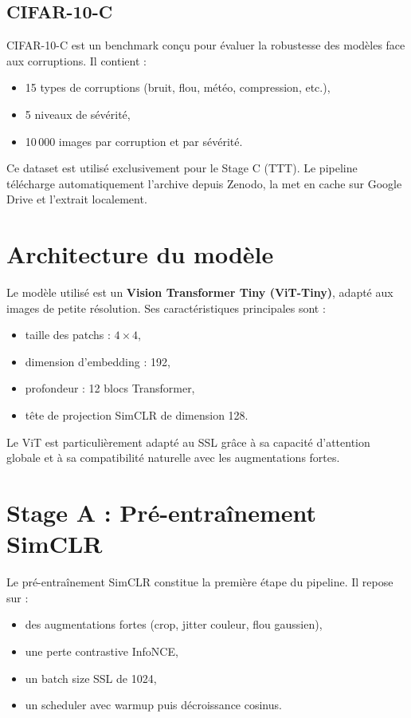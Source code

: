 \documentclass[12pt,a4paper]{report}
\begin{document}
	\subsection*{CIFAR-10-C}
	CIFAR-10-C est un benchmark conçu pour évaluer la robustesse des modèles face aux corruptions. Il contient :
	\begin{itemize}
		\item 15 types de corruptions (bruit, flou, météo, compression, etc.),
		\item 5 niveaux de sévérité,
		\item 10\,000 images par corruption et par sévérité.
	\end{itemize}
	
	Ce dataset est utilisé exclusivement pour le Stage C (TTT). Le pipeline télécharge automatiquement l’archive depuis Zenodo, la met en cache sur Google Drive et l’extrait localement.
	
	\section{Architecture du modèle}
	
	Le modèle utilisé est un \textbf{Vision Transformer Tiny (ViT-Tiny)}, adapté aux images de petite résolution. Ses caractéristiques principales sont :
	\begin{itemize}
		\item taille des patchs : $4 \times 4$,
		\item dimension d’embedding : 192,
		\item profondeur : 12 blocs Transformer,
		\item tête de projection SimCLR de dimension 128.
	\end{itemize}
	
	Le ViT est particulièrement adapté au SSL grâce à sa capacité d’attention globale et à sa compatibilité naturelle avec les augmentations fortes.
	
	\section{Stage A : Pré-entraînement SimCLR}
	
	Le pré-entraînement SimCLR constitue la première étape du pipeline. Il repose sur :
	\begin{itemize}
		\item des augmentations fortes (crop, jitter couleur, flou gaussien),
		\item une perte contrastive InfoNCE,
		\item un batch size SSL de 1024,
		\item un scheduler avec warmup puis décroissance cosinus.
	\end{itemize}
	
\end{document}
